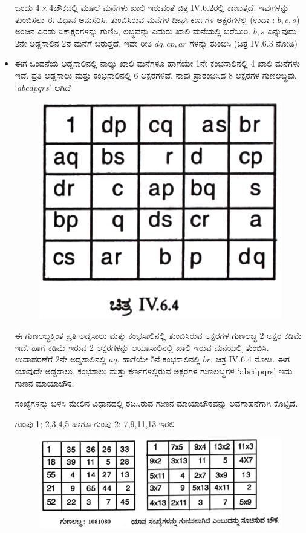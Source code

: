 \begin{itemize}
	ಒಂದು $4 \times 4$ಚೌಕದಲ್ಲಿ ಮೂಲೆ ಮನೆಗಳು ಖಾಲಿ ಇರುವಂತೆ ಚಿತ್ರ IV.6.2ರಲ್ಲಿ ಕಾಣುತ್ತದೆ. ಇವುಗಳನ್ನು ತುಂಬಿಸಲು ಈ ವಿಧಾನ ಅನುಸರಿಸಿ. ತುಂಬಿಸಿರುವ ಮನೆಗಳ ದೀರ್ಘಕರ್ಣಗಳ ಅಕ್ಷರಗಳಲ್ಲಿ (ಉದಾ : $b, c, s$) ಅಂಚಿನ ಎರಡು ಏಕಾಕ್ಷರಗಳನ್ನು ಗುಣಿಸಿ, ಲಬ್ಧವನ್ನು ಎದುರು ಖಾಲಿ ಮನೆಯಲ್ಲಿ ಬರೆಯಿರಿ. $b, s$ ಎನ್ನುವುದು 2ನೇ ಅಡ್ಡಸಾಲಿನ 2ನೆ ಮನೆಗೆ ಬರುತ್ತದೆ. ಇದೇ ರೀತಿ $dq, cp, ar$ ಗಳನ್ನು ತುಂಬಿಸಿ (ಚಿತ್ರ IV.6.3 ನೋಡಿ)
	\item ಈಗ ಒಂದನೆಯ ಅಡ್ಡಸಾಲಿನಲ್ಲಿ ನಾಲ್ಕು ಖಾಲಿ ಮನೆಗಳೂ ಹಾಗೆಯೇ 1ನೇ ಕಂಭಸಾಲಿನಲ್ಲಿ 4 ಖಾಲಿ ಮನೆಗಳು ಇವೆ. ಪ್ರತಿ ಅಡ್ಡಸಾಲು ಮತ್ತು ಕಂಭಸಾಲಿನಲ್ಲಿ 6 ಅಕ್ಷರಗಳಿವೆ. ನಾವು ಪ್ರಾರಂಭಿಸಿದ 8 ಅಕ್ಷರಗಳ ಗುಣಲಬ್ಧವು. $‘abcdpqrs’$ ಆಗಿದೆ
	\begin{figure}[H]
	\includegraphics{src/figures/chap7/fig7-29.jpg}
	\end{figure}

	ಈ ಗುಣಲಬ್ಧಕ್ಕಿಂತ ಪ್ರತಿ ಅಡ್ಡಸಾಲು ಮತ್ತು ಕಂಭಸಾಲಿನಲ್ಲಿ ತುಂಬಿಸಿರುವ ಅಕ್ಷರಗಳ ಗುಣಲಬ್ಧ 2 ಅಕ್ಷರ ಕಡಿಮೆ ಇದೆ. ಹಾಗೆ ಕಡಿಮೆ ಇರುವ 2 ಅಕ್ಷರಗಳನ್ನು ಆಯಾಸಾಲಿನಲ್ಲಿ ಖಾಲಿ ಇರುವ ಮನೆಯಲ್ಲಿ ತುಂಬಿಸಿ. ಉದಾಹರಣೆಗೆ 2ನೇ ಅಡ್ಡಸಾಲಿನಲ್ಲಿ $aq$. ಹಾಗೆಯೇ 5ನೆ ಕಂಭಸಾಲಿನಲ್ಲಿ $br$. ಚಿತ್ರ IV.6.4 ನೋಡಿ. ಈಗ ಯಾವುದೇ ಅಡ್ಡಸಾಲು, ಕಂಭಸಾಲು ಮತ್ತು ಕರ್ಣಗಳಲ್ಲಿರುವ ಅಕ್ಷರಗಳ ಗುಣಲಬ್ಧಗಳ `abcdpqrs’ ಇದು ಗುಣನ ಮಾಯಾಚೌಕ.

	ಸಂಖ್ಯೆಗಳನ್ನು ಬಳಸಿ ಮೇಲಿನ ವಿಧಾನದಲ್ಲಿ ರಚಿಸಿರುವ ಗುಣನ ಮಾಯಾಚೌಕವನ್ನು ಅವಗಾಹನೆಗಾಗಿ ಕೊಟ್ಟಿದೆ.

	ಗುಂಪು 1; 2,3,4,5 ಹಾಗೂ ಗುಂಪು 2: 7,9,11,13 ಇರಲಿ
	\begin{figure}[H]
	\includegraphics{src/figures/chap7/fig7-30.jpg}
	\end{figure}
\end{itemize}


